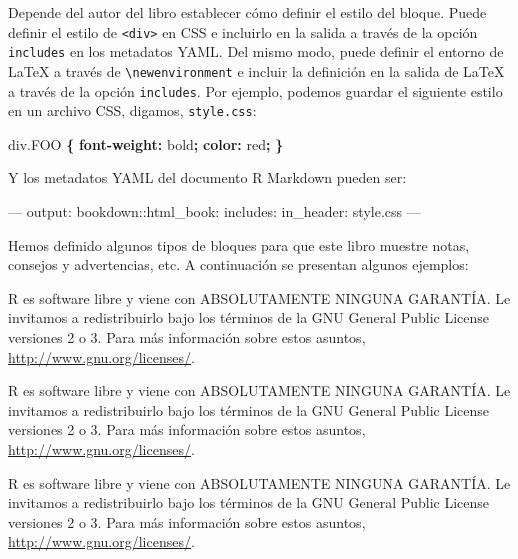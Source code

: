 \documentclass[12pt,]{krantz}
\makeatletter
\newenvironment{Shaded}{\begin{snugshade}}{\end{snugshade}}
\newcommand{\KeywordTok}[1]{\textcolor[rgb]{0.13,0.29,0.53}{\textbf{#1}}}
\newcommand{\DataTypeTok}[1]{\textcolor[rgb]{0.13,0.29,0.53}{#1}}
\newcommand{\FloatTok}[1]{\textcolor[rgb]{0.00,0.00,0.81}{#1}}
\newcommand{\OtherTok}[1]{\textcolor[rgb]{0.56,0.35,0.01}{#1}}
\newcommand{\FunctionTok}[1]{\textcolor[rgb]{0.00,0.00,0.00}{#1}}
\newcommand{\AttributeTok}[1]{\textcolor[rgb]{0.77,0.63,0.00}{#1}}
\newcommand{\NormalTok}[1]{#1}
\newenvironment{kframe}{%
\medskip{}
\setlength{\fboxsep}{.8em}
 \def\at@end@of@kframe{}%
 \ifinner\ifhmode%
  \def\at@end@of@kframe{\end{minipage}}%
  \begin{minipage}{\columnwidth}%
 \fi\fi%
 \def\FrameCommand##1{\hskip\@totalleftmargin \hskip-\fboxsep
 \colorbox{shadecolor}{##1}\hskip-\fboxsep
     \hskip-\linewidth \hskip-\@totalleftmargin \hskip\columnwidth}%
 \MakeFramed {\advance\hsize-\width
   \@totalleftmargin\z@ \linewidth\hsize
   \@setminipage}}%
 {\par\unskip\endMakeFramed%
 \at@end@of@kframe}
\renewenvironment{Shaded}{\begin{kframe}}{\end{kframe}}
\theoremstyle{definition}
\theoremstyle{definition}
\theoremstyle{definition}
\theoremstyle{remark}
\let\BeginKnitrBlock\begin \let\EndKnitrBlock\end
\makeatother
\begin{document}
Depende del autor del libro establecer cómo definir el estilo del
bloque. Puede definir el estilo de \texttt{\textless{}div\textgreater{}}
en CSS e incluirlo en la salida a través de la opción \texttt{includes}
en los metadatos YAML. Del mismo modo, puede definir el entorno de LaTeX
a través de \texttt{\textbackslash{}newenvironment} e incluir la
definición en la salida de LaTeX a través de la opción
\texttt{includes}. Por ejemplo, podemos guardar el siguiente estilo en
un archivo CSS, digamos, \texttt{style.css}:

\begin{Shaded}
\begin{Highlighting}[]
\NormalTok{div}\FloatTok{.FOO} \KeywordTok{\{}
  \KeywordTok{font-weight:} \DataTypeTok{bold}\KeywordTok{;}
  \KeywordTok{color:} \DataTypeTok{red}\KeywordTok{;}
\KeywordTok{\}}
\end{Highlighting}
\end{Shaded}

Y los metadatos YAML del documento R Markdown pueden ser:

\begin{Shaded}
\begin{Highlighting}[]
\OtherTok{---}
\FunctionTok{output:}
  \FunctionTok{bookdown:}\AttributeTok{:html_book:}
    \FunctionTok{includes:}
      \FunctionTok{in_header:}\AttributeTok{ style.css}
\OtherTok{---}
\end{Highlighting}
\end{Shaded}

Hemos definido algunos tipos de bloques para que este libro muestre
notas, consejos y advertencias, etc. A continuación se presentan algunos
ejemplos:

\BeginKnitrBlock{rmdnote}
R es software libre y viene con ABSOLUTAMENTE NINGUNA GARANTÍA. Le
invitamos a redistribuirlo bajo los términos de la GNU General Public
License versiones 2 o 3. Para más información sobre estos asuntos,
\url{http://www.gnu.org/licenses/}.
\EndKnitrBlock{rmdnote}

\BeginKnitrBlock{rmdcaution}
R es software libre y viene con ABSOLUTAMENTE NINGUNA GARANTÍA. Le
invitamos a redistribuirlo bajo los términos de la GNU General Public
License versiones 2 o 3. Para más información sobre estos asuntos,
\url{http://www.gnu.org/licenses/}.
\EndKnitrBlock{rmdcaution}

\BeginKnitrBlock{rmdimportant}
R es software libre y viene con ABSOLUTAMENTE NINGUNA GARANTÍA. Le
invitamos a redistribuirlo bajo los términos de la GNU General Public
License versiones 2 o 3. Para más información sobre estos asuntos,
\url{http://www.gnu.org/licenses/}.
\EndKnitrBlock{rmdimportant}
\end{document}
